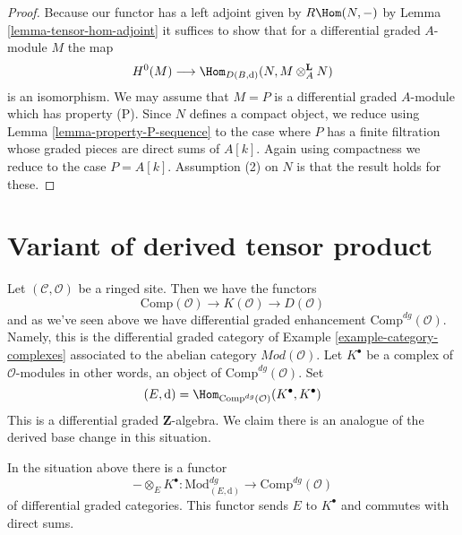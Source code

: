 \begin{proof}
Because our functor has a left adjoint given by
$R\Hom(N, -)$ by Lemma \ref{lemma-tensor-hom-adjoint}
it suffices to show that for a differential graded $A$-module $M$
the map
$$
H^0(M) \longrightarrow
\Hom_{D(B, \text{d})}(N, M \otimes_A^\mathbf{L} N)
$$
is an isomorphism. We may assume that $M = P$ is a differential graded
$A$-module which has property (P). Since $N$ defines a
compact object, we reduce using
Lemma \ref{lemma-property-P-sequence}
to the case where $P$ has a finite filtration whose graded pieces
are direct sums of $A[k]$. Again using compactness we reduce
to the case $P = A[k]$. Assumption (2) on $N$ is that
the result holds for these.
\end{proof}





\section{Variant of derived tensor product}
\label{section-variant-base-change}

\noindent
Let $(\mathcal{C}, \mathcal{O})$ be a ringed site. Then we have the functors
$$
\text{Comp}(\mathcal{O}) \to K(\mathcal{O}) \to D(\mathcal{O})
$$
and as we've seen above we have differential graded enhancement
$\text{Comp}^{dg}(\mathcal{O})$. Namely, this is the differential
graded category of Example \ref{example-category-complexes} associated
to the abelian category $\textit{Mod}(\mathcal{O})$.
Let $K^\bullet$ be a complex of $\mathcal{O}$-modules in other
words, an object of $\text{Comp}^{dg}(\mathcal{O})$. Set
$$
(E, \text{d}) =
\Hom_{\text{Comp}^{dg}(\mathcal{O})}(K^\bullet, K^\bullet)
$$
This is a differential graded $\mathbf{Z}$-algebra. We claim there is
an analogue of the derived base change in this situation.

\begin{lemma}
\label{lemma-tensor-with-complex}
In the situation above there is a functor
$$
- \otimes_E K^\bullet :
\text{Mod}^{dg}_{(E, \text{d})}
\longrightarrow
\text{Comp}^{dg}(\mathcal{O})
$$
of differential graded categories. This functor sends $E$ to $K^\bullet$
and commutes with direct sums.
\end{lemma}

